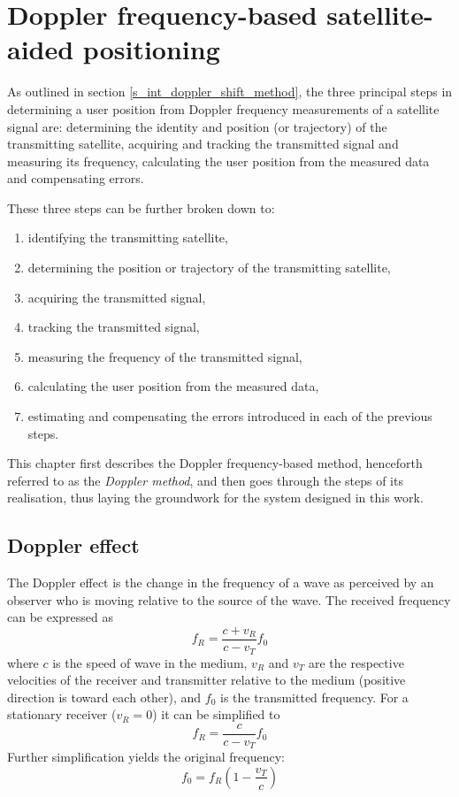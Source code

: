 \chapter{Doppler frequency-based satellite-aided positioning}
As outlined in section \ref{s_int_doppler_shift_method}, the three principal steps in determining a user position from Doppler frequency measurements of a satellite signal are: determining the identity and position (or trajectory) of the transmitting satellite, acquiring and tracking the transmitted signal and measuring its frequency, calculating the user position from the measured data and compensating errors. 

These three steps can be further broken down to:
\begin{enumerate}
    \item \label{l_pos_steps_1a} identifying the transmitting satellite,
    \item \label{l_pos_steps_1b} determining the position or trajectory of the transmitting satellite,
    \item \label{l_pos_steps_2a} acquiring the transmitted signal,
    \item \label{l_pos_steps_2b} tracking the transmitted signal,
    \item \label{l_pos_steps_2c} measuring the frequency of the transmitted signal,
    \item \label{l_pos_steps_3a} calculating the user position from the measured data,
    \item \label{l_pos_steps_3b} estimating and compensating the errors introduced in each of the previous steps.
\end{enumerate}

This chapter first describes the Doppler frequency-based method, henceforth referred to as the \emph{Doppler method}, and then goes through the steps of its realisation, thus laying the groundwork for the system designed in this work.

\section{Doppler effect}
The Doppler effect is the change in the frequency of a wave as perceived by an observer who is moving relative to the source of the wave. The received frequency can be expressed as
\begin{equation*}
    f_R = \frac{c + v_R}{c - v_T} f_0
\end{equation*}
 where $c$ is the speed of wave in the medium, $v_R$ and $v_T$ are the respective velocities of the receiver and transmitter relative to the medium (positive direction is toward each other), and $f_0$ is the transmitted frequency. For a stationary receiver ($v_R = 0$) it can be simplified to
 \begin{equation}
 \label{e_pos_doppler}
    f_R = \frac{c}{c - v_T} f_0
\end{equation}
Further simplification yields the original frequency:
 \begin{equation}
 \label{e_pos_doppler_f0}
    f_0 = f_R (1 - \frac{v_T}{c})
\end{equation}


